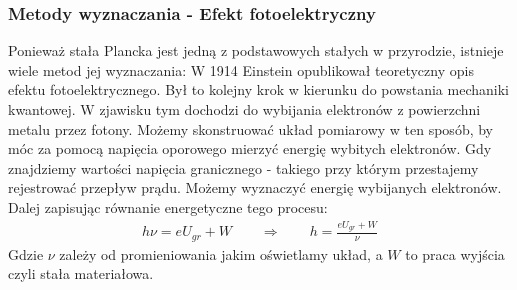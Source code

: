 \subsubsection{Metody wyznaczania - Efekt fotoelektryczny}
Ponieważ stała Plancka jest jedną z podstawowych stałych w przyrodzie, istnieje wiele metod jej wyznaczania:
	W 1914 Einstein opublikował teoretyczny opis efektu fotoelektrycznego. Był to kolejny krok w kierunku do powstania mechaniki kwantowej. W zjawisku tym dochodzi do wybijania elektronów z powierzchni metalu przez fotony. Możemy skonstruować układ pomiarowy w ten sposób, by móc za pomocą napięcia oporowego mierzyć energię wybitych elektronów. Gdy znajdziemy wartości napięcia granicznego - takiego przy którym przestajemy rejestrować przepływ prądu. Możemy wyznaczyć energię wybijanych elektronów. Dalej zapisując równanie energetyczne tego procesu:
	\begin{align*}
	h\nu=eU_{gr}+W\qquad\Rightarrow\qquad h=\frac{eU_{gr}+W}{\nu}
	\end{align*}
	Gdzie $\nu$ zależy od promieniowania jakim oświetlamy układ, a $W$ to praca wyjścia czyli stała materiałowa.